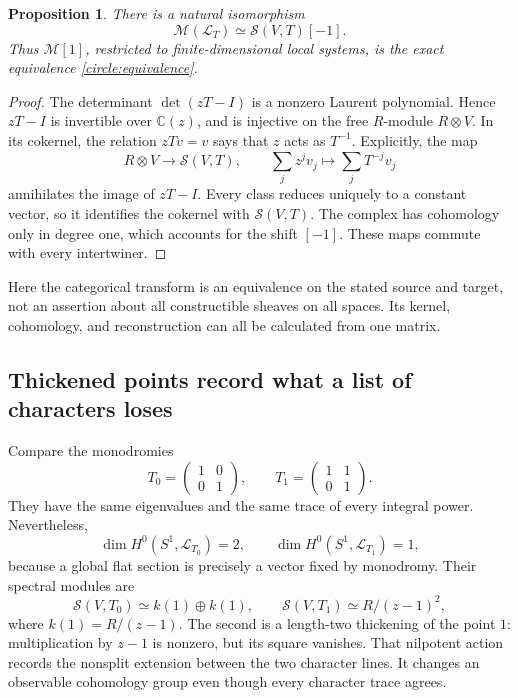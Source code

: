 \documentclass[11pt]{article}
\newtheorem{proposition}{Proposition}[section]
\theoremstyle{remark}
\newcommand{\C}{\mathbb C}
\begin{document}
\begin{proposition}
There is a natural isomorphism
\[
\mathcal M(\mathcal L_T)\simeq\mathcal S(V,T)[-1].
\]
Thus \(\mathcal M[1]\), restricted to finite-dimensional local systems, is the exact equivalence \eqref{circle:equivalence}.
\end{proposition}

\begin{proof}
The determinant \(\det(zT-I)\) is a nonzero Laurent polynomial. Hence \(zT-I\) is invertible over \(\C(z)\), and is injective on the free \(R\)-module \(R\otimes V\). In its cokernel, the relation \(zTv=v\) says that \(z\) acts as \(T^{-1}\). Explicitly, the map
\[
R\otimes V\longrightarrow\mathcal S(V,T),
\qquad \sum_j z^jv_j\longmapsto\sum_jT^{-j}v_j
\]
annihilates the image of \(zT-I\). Every class reduces uniquely to a constant vector, so it identifies the cokernel with \(\mathcal S(V,T)\). The complex has cohomology only in degree one, which accounts for the shift \([-1]\). These maps commute with every intertwiner.
\end{proof}

Here the categorical transform is an equivalence on the stated source and target, not an assertion about all constructible sheaves on all spaces. Its kernel, cohomology, and reconstruction can all be calculated from one matrix.

\subsection{Thickened points record what a list of characters loses}

Compare the monodromies
\[
T_0=\begin{pmatrix}1&0\\0&1\end{pmatrix},
\qquad
T_1=\begin{pmatrix}1&1\\0&1\end{pmatrix}.
\]
They have the same eigenvalues and the same trace of every integral power. Nevertheless,
\[
\dim H^0(S^1,\mathcal L_{T_0})=2,
\qquad
\dim H^0(S^1,\mathcal L_{T_1})=1,
\]
because a global flat section is precisely a vector fixed by monodromy. Their spectral modules are
\[
\mathcal S(V,T_0)\simeq k(1)\oplus k(1),
\qquad
\mathcal S(V,T_1)\simeq R/(z-1)^2,
\]
where \(k(1)=R/(z-1)\). The second is a length-two thickening of the point \(1\): multiplication by \(z-1\) is nonzero, but its square vanishes. That nilpotent action records the nonsplit extension between the two character lines. It changes an observable cohomology group even though every character trace agrees.
\end{document}
